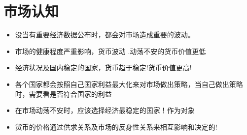 \chapter{市场认知}
\begin{itemize}
\item 没当有重要经济数据公布时，都会对市场造成重要的波动。
\item 市场的健康程度严重影响，货币波动 .动荡不安的货币价值更低
\item 经济状况及国内稳定的国家，货币趋于稳定!货币价值更高!
\item 各个国家都会按照自己国家利益最大化来对市场做出策略，当自己做出策略时，需要看是否符合国家的利益
\item 在市场动荡不安时，应该选择经济最稳定的国家！作为对象
\item 货币的价格通过供求关系及市场的反身性关系来相互影响和决定的!
\end{itemize}